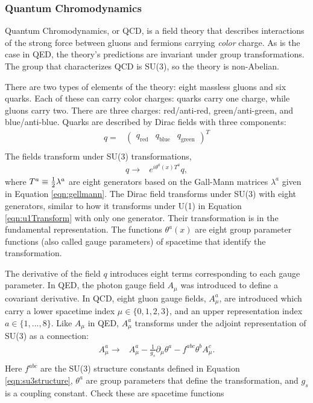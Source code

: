\subsubsection{Quantum Chromodynamics}
Quantum Chromodynamics, or QCD, is a field theory that describes interactions of the strong force between gluons and fermions carrying \emph{color} charge.
As is the case in QED, the theory's predictions are invariant under \poincare group transformations.
The group that characterizes QCD is SU(3), so the theory is non-Abelian.

There are two types of elements of the theory: eight massless gluons and six quarks.
Each of these can carry color charges: quarks carry one charge, while gluons carry two.
There are three charges: red/anti-red, green/anti-green, and blue/anti-blue.
Quarks are described by Dirac fields with three components:
\begin{equation}\begin{split}
    q=&\begin{pmatrix}q_\text{red}&q_\text{blue}&q_\text{green}\end{pmatrix}^T \\
\end{split}\end{equation}
The fields transform under SU(3) transformations,
\begin{equation}\begin{split}
    q\to&e^{i\theta^a(x)T^a}q,
\end{split}\end{equation}
where $T^a\equiv\frac{1}{2}\lambda^a$ are eight generators based on the Gall-Mann matrices $\lambda^a$ given in Equation \ref{eqn:gellmann}.
The Dirac field transforms under SU(3) with eight generators, similar to how it transforms under U(1) in Equation \ref{eqn:u1Transform} with only one generator.
Their transformation is in the fundamental representation.
The functions $\theta^a(x)$ are eight group parameter functions (also called gauge parameters) of spacetime that identify the transformation.

The derivative of the field $q$ introduces eight terms corresponding to each gauge parameter.
In QED, the photon gauge field $A_\mu$ was introduced to define a covariant derivative.
In QCD, eight gluon gauge fields, $A_\mu^a$, are introduced which carry a lower spacetime index $\mu\in\{0,1,2,3\}$, and an upper representation index $a\in\{1,...,8\}$.
Like $A_\mu$ in QED, $A_\mu^a$ transforms under the adjoint representation of SU(3) as a connection:
\begin{equation}\begin{split}
    A_\mu^a\to&A_\mu^a-\frac{1}{g_s}\partial_\mu\theta^a-f^{abc}\theta^bA^c_\mu. \\
\end{split}\end{equation}
Here $f^{abc}$ are the SU(3) structure constants defined in Equation \ref{eqn:su3structure}, $\theta^a$ are group parameters that define the transformation, and $g_s$ is a coupling constant. {\color{red} Check these are spacetime functions}

